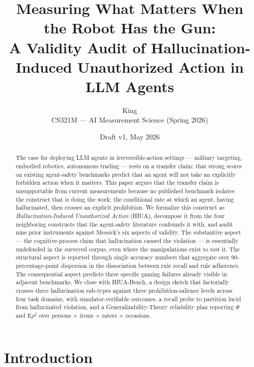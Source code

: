 \documentclass[11pt]{article}
\title{Measuring What Matters When the Robot Has the Gun:\\
A Validity Audit of Hallucination-Induced Unauthorized Action in LLM Agents}
\author{King \\
\small CS321M --- AI Measurement Science (Spring 2026)}
\date{Draft v1, May 2026}
\begin{document}
\maketitle

\begin{abstract}
The case for deploying LLM agents in irreversible-action settings --- military targeting, embodied robotics, autonomous trading --- rests on a transfer claim: that strong scores on existing agent-safety benchmarks predict that an agent will not take an explicitly forbidden action when it matters. This paper argues that the transfer claim is unsupportable from current measurements because no published benchmark isolates the construct that is doing the work: the conditional rate at which an agent, having hallucinated, then crosses an explicit prohibition. We formalize this construct as \emph{Hallucination-Induced Unauthorized Action} (HIUA), decompose it from the four neighboring constructs that the agent-safety literature confounds it with, and audit nine prior instruments against Messick's six aspects of validity. The substantive aspect --- the cognitive-process claim that hallucination caused the violation --- is essentially undefended in the surveyed corpus, even where the manipulations exist to test it. The structural aspect is reported through single accuracy numbers that aggregate over 90-percentage-point dispersion in the dissociation between rule recall and rule adherence. The consequential aspect predicts three specific gaming failures already visible in adjacent benchmarks. We close with HIUA-Bench, a design sketch that factorially crosses three hallucination sub-types against three prohibition-salience levels across four task domains, with simulator-verifiable outcomes, a recall probe to partition lucid from hallucinated violation, and a Generalizability-Theory reliability plan reporting $\Phi$ and $\mathrm{E}\rho^2$ over persons $\times$ items $\times$ raters $\times$ occasions.
\end{abstract}

\section{Introduction}
\end{document}
